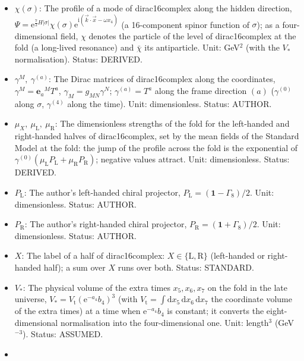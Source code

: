 \documentclass[
  10pt,
]{article}
\providecommand{\tightlist}{%
  \setlength{\itemsep}{0pt}\setlength{\parskip}{0pt}}
\begin{document}
\begin{itemize}
\tightlist
\item
  \(\chi(\sigma)\): The profile of a mode of dirac16complex along the
  hidden direction,
  \(\Psi = \mathrm{e}^{\frac72H\lvert\sigma\rvert}\chi(\sigma)\mathrm{e}^{\mathrm{i}(\vec k\cdot\vec x - \omega x_4)}\)
  (a 16-component spinor function of \(\sigma\)); as a four-dimensional
  field, \(\chi\) denotes the particle of the level of dirac16complex at
  the fold (a long-lived resonance) and \(\bar\chi\) its antiparticle.
  Unit: GeV\(^{2}\) (with the \(V_*\) normalisation). Status: DERIVED.
\item
  \(\gamma^M,\ \gamma^{(a)}\): The Dirac matrices of dirac16complex
  along the coordinates, \(\gamma^M = \mathbf{e}_a{}^MT^a\),
  \(\gamma_M = g_{MN}\gamma^N\); \(\gamma^{(a)} = T^a\) along the frame
  direction \((a)\) (\(\gamma^{(0)}\) along \(\sigma\), \(\gamma^{(4)}\)
  along the time). Unit: dimensionless. Status: AUTHOR.
\item
  \(\mu_X,\ \mu_{\mathrm{L}},\ \mu_{\mathrm{R}}\): The dimensionless
  strengths of the fold for the left-handed and right-handed halves of
  dirac16complex, set by the mean fields of the Standard Model at the
  fold: the jump of the profile across the fold is the exponential of
  \(\gamma^{(0)}(\mu_{\mathrm{L}}P_{\mathrm{L}} + \mu_{\mathrm{R}}P_{\mathrm{R}})\);
  negative values attract. Unit: dimensionless. Status: DERIVED.
\item
  \(P_{\mathrm{L}}\): The author's left-handed chiral projector,
  \(P_{\mathrm{L}} = (\mathbf{1} - \Gamma_8)/2\). Unit: dimensionless.
  Status: AUTHOR.
\item
  \(P_{\mathrm{R}}\): The author's right-handed chiral projector,
  \(P_{\mathrm{R}} = (\mathbf{1} + \Gamma_8)/2\). Unit: dimensionless.
  Status: AUTHOR.
\item
  \(X\): The label of a half of dirac16complex:
  \(X \in \{\mathrm{L}, \mathrm{R}\}\) (left-handed or right-handed
  half); a sum over \(X\) runs over both. Status: STANDARD.
\item
  \(V_*\): The physical volume of the extra times \(x_5, x_6, x_7\) on
  the fold in the late universe,
  \(V_* = V_{\mathrm{t}}(\mathrm{e}^{-a_4}b_4)^3\) (with
  \(V_{\mathrm{t}} = \int\mathrm{d}x_5\,\mathrm{d}x_6\,\mathrm{d}x_7\)
  the coordinate volume of the extra times) at a time when
  \(\mathrm{e}^{-a_4}b_4\) is constant; it converts the
  eight-dimensional normalisation into the four-dimensional one. Unit:
  length\(^3\) (GeV\(^{-3}\)). Status: ASSUMED.
\item

\end{itemize}
\end{document}
